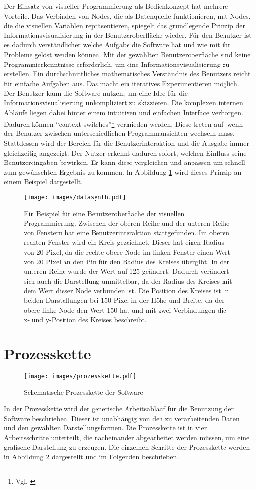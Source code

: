 \documentclass[a4paper, 
               12pt,
               DIV=calc,
               version=first,
               pdftex,
               headsepline,
               footsepline,
               bibtotocnumbered,
               liststotocnumbered]{scrreprt}
\begin{document}
Der Einsatz von visueller Programmierung als Bedienkonzept hat
mehrere Vorteile. Das Verbinden von Nodes, die als Datenquelle funktionieren, mit Nodes, die
die visuellen Variablen repräsentieren, spiegelt das grundlegende
Prinzip der Informationsvisualisierung in der Benutzeroberfläche wieder. Für den Benutzer ist
es dadurch verständlicher welche Aufgabe die Software hat und wie mit ihr Probleme gelöst
werden können.
Mit der gewählten Benutzeroberfläche sind keine Programmierkenntnisse erforderlich, um eine Informationsvisualisierung
zu erstellen. Ein durchschnittliches mathematisches Verständnis des Benutzers reicht für einfache Aufgaben aus.
Das macht ein iteratives Experimentieren möglich. Der Benutzer kann die Software nutzen, um eine
Idee für die Informationsvisualisierung unkompliziert zu skizzieren.
Die komplexen internen Abläufe liegen dabei hinter einem intuitiven und einfachen Interface
verborgen. Dadurch können "`context switches"'\footnote{Vgl. \citep[S.\,50]{Tufte}}
vermieden werden. Diese treten auf, wenn der Benutzer zwischen unterschiedlichen Programmansichten wechseln
muss. Stattdessen wird der Bereich für die Benutzerinteraktion und die Ausgabe
immer gleichzeitig angezeigt. Der Nutzer erkennt dadurch sofort, welchen Einfluss seine Benutzereingaben bewirken. Er
kann diese vergleichen und anpassen um schnell zum gewünschten Ergebnis zu kommen.
In Abbildung \ref{fig:datasynth} wird dieses Prinzip an einem Beispiel dargestellt.
\begin{figure}
\centering
\texttt{[image: images/datasynth.pdf]}
\caption{Ein Beispiel für eine Benutzeroberfläche der visuellen Programmierung. Zwischen der oberen Reihe
und der unteren Reihe von Fenstern hat eine Benutzerinteraktion stattgefunden.
Im oberen rechten Fenster wird ein Kreis gezeichnet. Dieser hat einen Radius von 20 Pixel, da
die rechte obere Node im linken Fenster einen Wert von 20 Pixel an den Pin für den Radius des Kreises übergibt.
In der unteren Reihe wurde der Wert auf 125 geändert. Dadurch verändert sich
auch die Darstellung unmittelbar, da der Radius des Kreises mit dem Wert dieser Node verbunden ist. Die Position
des Kreises ist in beiden Darstellungen bei 150 Pixel in der Höhe und Breite, da der obere linke Node den Wert 150 hat und mit
zwei Verbindungen die x- und y-Position des Kreises beschreibt.}
\label{fig:datasynth}
\end{figure}

\section{Prozesskette}
\begin{figure}
\centering
\texttt{[image: images/prozesskette.pdf]}
\caption{Schematische Prozesskette der Software}
\label{fig:prozesskette}
\end{figure}
In der Prozesskette wird der generische Arbeitsablauf für die Benutzung
der Software beschrieben. Dieser ist unabhängig von den zu verarbeitenden Daten
und den gewählten Darstellungsformen. Die Prozesskette ist in vier
Arbeitsschritte unterteilt, die nacheinander abgearbeitet werden müssen,
um eine grafische Darstellung zu erzeugen.
Die einzelnen Schritte der Prozesskette werden in Abbildung \ref{fig:prozesskette} dargestellt und im
Folgenden beschrieben.
\end{document}
